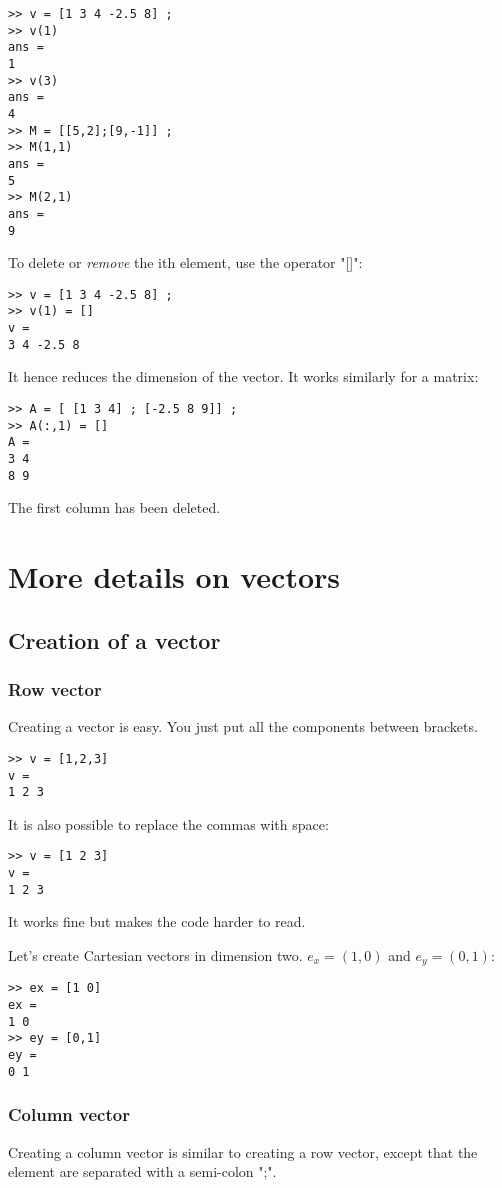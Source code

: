 \begin{lstlisting}
>> v = [1 3 4 -2.5 8] ;
>> v(1)
ans = 
1
>> v(3)
ans = 
4
>> M = [[5,2];[9,-1]] ;
>> M(1,1)
ans =
5
>> M(2,1)
ans =
9
\end{lstlisting}

To delete or \emph{remove} the ith element, use the operator "[]":

\begin{lstlisting}
>> v = [1 3 4 -2.5 8] ;
>> v(1) = []
v = 
3 4 -2.5 8
\end{lstlisting}
It hence reduces the dimension of the vector. It works similarly for a matrix:
\begin{lstlisting}
>> A = [ [1 3 4] ; [-2.5 8 9]] ;
>> A(:,1) = []
A = 
3 4
8 9
\end{lstlisting}
The first column has been deleted.




\section{More details on vectors}
\subsection{Creation of a vector}
\subsubsection{Row vector}
Creating a vector  is easy. You just put all the components between brackets.
\begin{lstlisting}
>> v = [1,2,3]
v =
1 2 3
\end{lstlisting}
It is also possible to replace the commas with space:
\begin{lstlisting}
>> v = [1 2 3]
v =
1 2 3
\end{lstlisting}

It works fine but makes the code harder to read.

Let's create Cartesian vectors in dimension two. $e_x = (1,0)$ and $e_y = (0,1)$:


\begin{lstlisting}
>> ex = [1 0]
ex =
1 0
>> ey = [0,1]
ey =
0 1
\end{lstlisting}
 


\subsubsection{Column vector}
Creating a column vector is similar to creating a row vector, except that the element are separated with a semi-colon ";".


